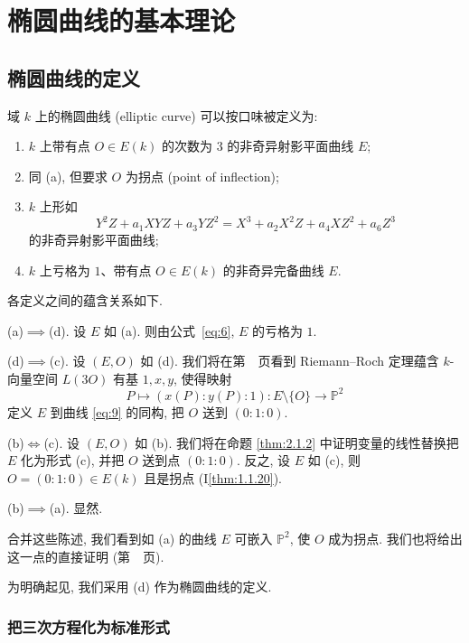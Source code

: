 \chapter{椭圆曲线的基本理论}\label{ch:2}

\section{椭圆曲线的定义}\label{sec:2.1}

\begin{definition} \label{thm:2.1.1} 
域 $k$ 上的椭圆曲线 (elliptic curve) 可以按口味被定义为:
\begin{enumerate}[label=\textup{(\alph*)}]
\item $k$ 上带有点 $O\in E(k)$ 的次数为 $3$ 的非奇异射影平面曲线 $E$;
\item 同 (a), 但要求 $O$ 为拐点 (point of inflection);
\item $k$ 上形如
\begin{equation} \label{eq:9}
Y^2Z + a_1XYZ + a_3YZ^2 = X^3 + a_2X^2Z + a_4XZ^2 + a_6Z^3
\tag{9}
\end{equation}
的非奇异射影平面曲线;
\item $k$ 上亏格为 $1$、带有点 $O\in E(k)$ 的非奇异完备曲线 $E$.
\end{enumerate}
\end{definition}

各定义之间的蕴含关系如下.

(a)$\implies$(d). 设 $E$ 如 (a). 则由公式~\eqref{eq:6}, $E$ 的亏格为 $1$.

(d)$\implies$(c). 设 $(E,O)$ 如 (d). 我们将在第~\pageref{subsec:genus1-embedding}~页看到 Riemann--Roch 定理蕴含 $k$-向量空间 $L(3O)$ 有基 $1, x, y$, 使得映射
\[
P\mapsto(x(P):y(P):1)\colon E\setminus\{O\}\to\mathbb{P}^2
\]
定义 $E$ 到曲线 \eqref{eq:9} 的同构, 把 $O$ 送到 $(0:1:0)$.

(b)$\iff$(c). 设 $(E,O)$ 如 (b). 我们将在命题 \ref{thm:2.1.2} 中证明变量的线性替换把 $E$ 化为形式 (c), 并把 $O$ 送到点 $(0:1:0)$. 反之, 设 $E$ 如 (c), 则 $O = (0:1:0)\in E(k)$ 且是拐点 (I\ref{thm:1.1.20}).

(b)$\implies$(a). 显然.

合并这些陈述, 我们看到如 (a) 的曲线 $E$ 可嵌入 $\mathbb{P}^2$, 使 $O$ 成为拐点. 我们也将给出这一点的直接证明 (第~\pageref{subsec:genus1-embedding}~页).

为明确起见, 我们采用 (d) 作为椭圆曲线的定义.

\subsection*{把三次方程化为标准形式}

